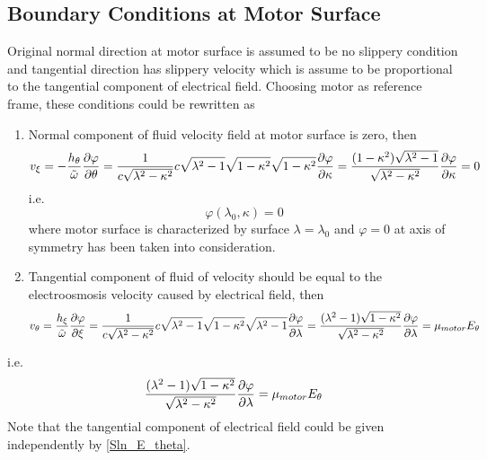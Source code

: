 \documentclass[fontsize=11pt, %
                             paper=a4, %
                             twoside, %
                             captions=tableheading,
                             index=totoc,
                             hyperref]{labbook}
\begin{document}
\subsection{Boundary Conditions at Motor Surface}
Original normal direction at motor surface is assumed to be no slippery condition and tangential direction has slippery velocity which is assume to be proportional to the tangential component of electrical field. Choosing motor as reference frame, these conditions could be rewritten as
\begin{enumerate}
\item
Normal component of fluid velocity field at motor surface is zero, then
\begin{equation}
v_{\xi}=-\frac{h_\theta}{\tilde{\omega}}\frac{\partial \varphi}{\partial \theta}=\frac{1}{c\sqrt{\lambda^2-\kappa^2}}c\sqrt{\lambda^2-1}\sqrt{1-\kappa^2}\sqrt{1-\kappa^2}\frac{\partial \varphi}{\partial \kappa}=\frac{(1-\kappa^2)\sqrt{\lambda^2-1}}{\sqrt{\lambda^2-\kappa^2}}\frac{\partial \varphi}{\partial \kappa}=0
\end{equation}
i.e.
\begin{equation}
\varphi(\lambda_0,\kappa)=0
\end{equation}
where motor surface is characterized by surface $\lambda=\lambda_0$ and $\varphi=0$ at axis of symmetry has been taken into consideration.
\item Tangential component of fluid of velocity should be equal to the electroosmosis velocity caused by electrical field, then
\begin{equation}
v_\theta=\frac{h_\xi}{\tilde{\omega}}\frac{\partial \varphi}{\partial \xi}=\frac{1}{c\sqrt{\lambda^2-\kappa^2}}c\sqrt{\lambda^2-1}\sqrt{1-\kappa^2}\sqrt{\lambda^2-1}\frac{\partial \varphi}{\partial \lambda}=\frac{(\lambda^2-1)\sqrt{1-\kappa^2}}{\sqrt{\lambda^2-\kappa^2}}\frac{\partial \varphi}{\partial \lambda}=\mu_{motor}E_\theta
\end{equation}
\end{enumerate}
i.e.
\begin{equation}
\frac{(\lambda^2-1)\sqrt{1-\kappa^2}}{\sqrt{\lambda^2-\kappa^2}}\frac{\partial \varphi}{\partial \lambda}=\mu_{motor}E_\theta
\end{equation}
Note that the tangential component of electrical field could be given independently by \ref{Sln_E_theta}.
\end{document}
